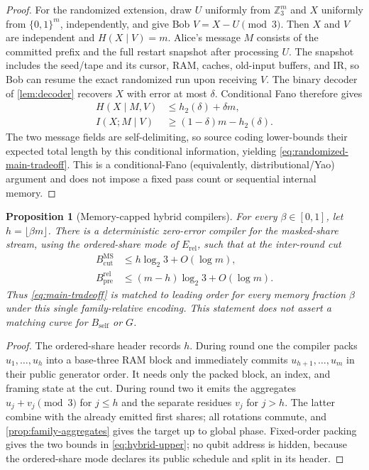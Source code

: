 \documentclass[a4paper,twocolumn,10pt,unpublished]{quantumarticle}
\newtheorem{proposition}{Proposition}
\begin{document}
\begin{proof}
For the randomized extension, draw $U$ uniformly from $\mathbb Z_3^m$ and
$X$ uniformly from $\{0,1\}^m$, independently, and give Bob
$V=X-U\pmod3$.  Then $X$ and $V$ are independent and $H(X\mid V)=m$.
Alice's message $M$ consists of the committed prefix and the full restart
snapshot after processing $U$.  The snapshot includes the seed/tape and its
cursor, RAM, caches, old-input buffers, and IR, so Bob can resume the exact
randomized run upon receiving $V$.  The binary decoder of
\cref{lem:decoder} recovers $X$ with error at most $\delta$.  Conditional
Fano therefore gives
\begin{align*}
 H(X\mid M,V)&\leq h_2(\delta)+\delta m,\\
 I(X;M\mid V)&\geq(1-\delta)m-h_2(\delta).
\end{align*}
The two message fields are self-delimiting, so source coding lower-bounds
their expected total length by this conditional information, yielding
\eqref{eq:randomized-main-tradeoff}.  This is a conditional-Fano
(equivalently, distributional/Yao) argument and does not impose a fixed pass
count or sequential internal memory.
\end{proof}

\begin{proposition}[Memory-capped hybrid compilers]
\label{prop:hybrid-upper}
For every $\beta\in[0,1]$, let $h=\lfloor\beta m\rfloor$.  There is a
deterministic zero-error compiler for the masked-share stream, using the
ordered-share mode of $E_{\mathrm{rel}}$, such that at the inter-round cut
\begin{equation}\label{eq:hybrid-upper}
\begin{aligned}
 B_{\mathrm{cut}}^{\mathrm{MS}}
 &\leq h\log_2 3+O(\log m),\\
 B_{\mathrm{pre}}^{\mathrm{rel}}
 &\leq(m-h)\log_2 3+O(\log m).
\end{aligned}
\end{equation}
Thus \eqref{eq:main-tradeoff} is matched to leading order for every memory
fraction $\beta$ under this single family-relative encoding.  This statement
does not assert a matching curve for $B_{\mathrm{self}}$ or $G$.
\end{proposition}

\begin{proof}
The ordered-share header records $h$.  During round one the compiler packs
$u_1,\ldots,u_h$ into a base-three RAM block and immediately commits
$u_{h+1},\ldots,u_m$ in their public generator order.  It needs only the
packed block, an index, and framing state at the cut.  During round two it
emits the aggregates $u_j+v_j\pmod3$ for $j\leq h$ and the separate residues
$v_j$ for $j>h$.  The latter combine with the already emitted first shares;
all rotations commute, and \cref{prop:family-aggregates} gives the target up
to global phase.  Fixed-order packing gives the two bounds in
\eqref{eq:hybrid-upper}; no qubit address is hidden, because the ordered-share
mode declares its public schedule and split in its header.
\end{proof}
\end{document}

